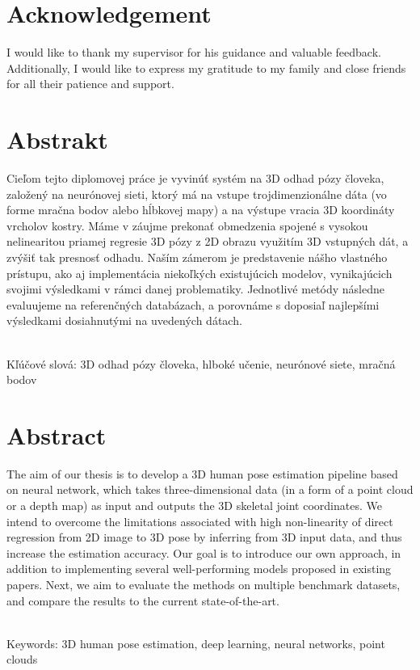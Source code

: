 \documentclass[12pt, a4paper, oneside]{book}
\begin{document}
\chapter*{Acknowledgement}\label{chap:thank_you}
I would like to thank my supervisor for his guidance and valuable feedback. Additionally, I would like to express my gratitude to
my family and close friends for all their patience and support.

\chapter*{Abstrakt}\label{chap:abstract_sk}
Cieľom tejto diplomovej práce je vyvinúť systém na 3D odhad pózy človeka, založený na neurónovej sieti, ktorý má na vstupe trojdimenzionálne dáta (vo forme mračna bodov alebo hĺbkovej mapy) a na výstupe vracia 3D koordináty vrcholov kostry. Máme v záujme prekonať obmedzenia spojené s vysokou nelinearitou priamej regresie 3D pózy z 2D obrazu využitím 3D vstupných dát, a zvýšiť tak presnosť odhadu. Naším zámerom je predstavenie nášho vlastného prístupu, ako aj implementácia niekoľkých existujúcich modelov, vynikajúcich svojimi výsledkami v rámci danej problematiky. Jednotlivé metódy následne evaluujeme na referenčných databázach, a porovnáme s doposiaľ najlepšími výsledkami dosiahnutými na uvedených dátach.

~\\
Kľúčové slová: 3D odhad pózy človeka, hlboké učenie, neurónové siete, mračná bodov
\vfill\eject 

\chapter*{Abstract}\label{chap:abstract_en}
The aim of our thesis is to develop a 3D human pose estimation pipeline based on neural network, which takes three-dimensional data (in a form of a point cloud or a depth map) as input and outputs the 3D skeletal joint coordinates. We intend to overcome the limitations associated with high non-linearity of direct regression from 2D image to 3D pose by inferring from 3D input data, and thus increase the estimation accuracy. Our goal is to introduce our own approach, in addition to implementing several well-performing models proposed in existing papers. Next, we aim to evaluate the methods on multiple benchmark datasets, and compare the results to the current state-of-the-art.

~\\
Keywords: 3D human pose estimation, deep learning, neural networks, point clouds
\vfill\eject 


\tableofcontents

\listoftables
\listoffigures

\mainmatter










\backmatter

\nocite{*}


\end{document}
